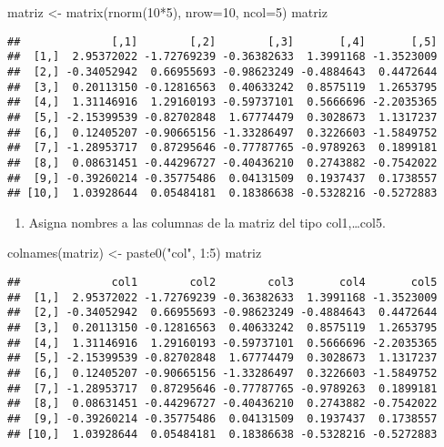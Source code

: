 \documentclass[
]{article}
\newenvironment{Shaded}{\begin{snugshade}}{\end{snugshade}}
\newcommand{\AttributeTok}[1]{\textcolor[rgb]{0.77,0.63,0.00}{#1}}
\newcommand{\DecValTok}[1]{\textcolor[rgb]{0.00,0.00,0.81}{#1}}
\newcommand{\FunctionTok}[1]{\textcolor[rgb]{0.00,0.00,0.00}{#1}}
\newcommand{\NormalTok}[1]{#1}
\newcommand{\OtherTok}[1]{\textcolor[rgb]{0.56,0.35,0.01}{#1}}
\newcommand{\SpecialCharTok}[1]{\textcolor[rgb]{0.00,0.00,0.00}{#1}}
\newcommand{\StringTok}[1]{\textcolor[rgb]{0.31,0.60,0.02}{#1}}
\providecommand{\tightlist}{%
  \setlength{\itemsep}{0pt}\setlength{\parskip}{0pt}}
\begin{document}
\begin{Shaded}
\begin{Highlighting}[]
\NormalTok{matriz }\OtherTok{\textless{}{-}} \FunctionTok{matrix}\NormalTok{(}\FunctionTok{rnorm}\NormalTok{(}\DecValTok{10}\SpecialCharTok{*}\DecValTok{5}\NormalTok{), }\AttributeTok{nrow=}\DecValTok{10}\NormalTok{, }\AttributeTok{ncol=}\DecValTok{5}\NormalTok{)}
\NormalTok{matriz}
\end{Highlighting}
\end{Shaded}

\begin{verbatim}
##              [,1]        [,2]        [,3]       [,4]       [,5]
##  [1,]  2.95372022 -1.72769239 -0.36382633  1.3991168 -1.3523009
##  [2,] -0.34052942  0.66955693 -0.98623249 -0.4884643  0.4472644
##  [3,]  0.20113150 -0.12816563  0.40633242  0.8575119  1.2653795
##  [4,]  1.31146916  1.29160193 -0.59737101  0.5666696 -2.2035365
##  [5,] -2.15399539 -0.82702848  1.67774479  0.3028673  1.1317237
##  [6,]  0.12405207 -0.90665156 -1.33286497  0.3226603 -1.5849752
##  [7,] -1.28953717  0.87295646 -0.77787765 -0.9789263  0.1899181
##  [8,]  0.08631451 -0.44296727 -0.40436210  0.2743882 -0.7542022
##  [9,] -0.39260214 -0.35775486  0.04131509  0.1937437  0.1738557
## [10,]  1.03928644  0.05484181  0.18386638 -0.5328216 -0.5272883
\end{verbatim}

\begin{enumerate}
\def\labelenumi{\arabic{enumi}.}
\tightlist
\item
  Asigna nombres a las columnas de la matriz del tipo col1,\ldots col5.
\end{enumerate}

\begin{Shaded}
\begin{Highlighting}[]
\FunctionTok{colnames}\NormalTok{(matriz) }\OtherTok{\textless{}{-}} \FunctionTok{paste0}\NormalTok{(}\StringTok{"col"}\NormalTok{, }\DecValTok{1}\SpecialCharTok{:}\DecValTok{5}\NormalTok{)}
\NormalTok{matriz}
\end{Highlighting}
\end{Shaded}

\begin{verbatim}
##              col1        col2        col3       col4       col5
##  [1,]  2.95372022 -1.72769239 -0.36382633  1.3991168 -1.3523009
##  [2,] -0.34052942  0.66955693 -0.98623249 -0.4884643  0.4472644
##  [3,]  0.20113150 -0.12816563  0.40633242  0.8575119  1.2653795
##  [4,]  1.31146916  1.29160193 -0.59737101  0.5666696 -2.2035365
##  [5,] -2.15399539 -0.82702848  1.67774479  0.3028673  1.1317237
##  [6,]  0.12405207 -0.90665156 -1.33286497  0.3226603 -1.5849752
##  [7,] -1.28953717  0.87295646 -0.77787765 -0.9789263  0.1899181
##  [8,]  0.08631451 -0.44296727 -0.40436210  0.2743882 -0.7542022
##  [9,] -0.39260214 -0.35775486  0.04131509  0.1937437  0.1738557
## [10,]  1.03928644  0.05484181  0.18386638 -0.5328216 -0.5272883
\end{verbatim}
\end{document}

